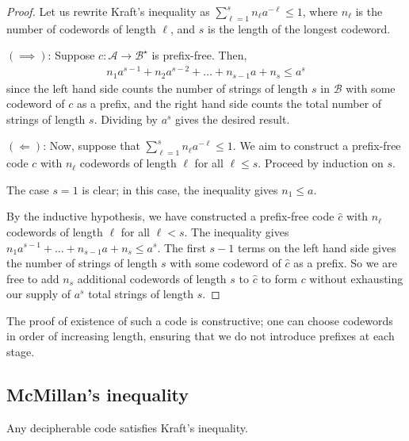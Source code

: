 \begin{proof}
    Let us rewrite Kraft's inequality as $\sum_{\ell=1}^s n_\ell a^{-\ell} \leq 1$, where $n_\ell$ is the number of codewords of length $\ell$, and $s$ is the length of the longest codeword.

    $(\implies)$: Suppose $c \colon \mathcal A \to \mathcal B^\star$ is prefix-free.
    Then,
    \begin{align*}
        n_1 a^{s-1} + n_2 a^{s-2} + \dots + n_{s-1} a + n_s \leq a^s
    \end{align*}
    since the left hand side counts the number of strings of length $s$ in $\mathcal B$ with some codeword of $c$ as a prefix, and the right hand side counts the total number of strings of length $s$.
    Dividing by $a^s$ gives the desired result.

    $(\Longleftarrow)$: Now, suppose that $\sum_{\ell=1}^s n_\ell a^{-\ell} \leq 1$.
    We aim to construct a prefix-free code $c$ with $n_\ell$ codewords of length $\ell$ for all $\ell \leq s$.
    Proceed by induction on $s$.

    The case $s = 1$ is clear; in this case, the inequality gives $n_1 \leq a$.

    By the inductive hypothesis, we have constructed a prefix-free code $\hat c$ with $n_\ell$ codewords of length $\ell$ for all $\ell < s$.
    The inequality gives $n_1 a^{s-1} + \dots + n_{s-1} a + n_s \leq a^s$.
    The first $s - 1$ terms on the left hand side gives the number of strings of length $s$ with some codeword of $\hat c$ as a prefix.
    So we are free to add $n_s$ additional codewords of length $s$ to $\hat c$ to form $c$ without exhausting our supply of $a^s$ total strings of length $s$.
\end{proof}

\begin{remark}
    The proof of existence of such a code is constructive; one can choose codewords in order of increasing length, ensuring that we do not introduce prefixes at each stage.
\end{remark}

\subsection{McMillan's inequality}
\begin{theorem}
    Any decipherable code satisfies Kraft's inequality.
\end{theorem}

